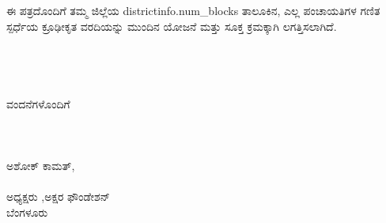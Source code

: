 \documentclass[12pt]{article}
\begin{document}
{{\\~\\
ಈ ಪತ್ರದೊಂದಿಗೆ ತಮ್ಮ ಜಿಲ್ಲೆಯ {{districtinfo.num_blocks}} ತಾಲೂಕಿನ, ಎಲ್ಲ ಪಂಚಾಯತಿಗಳ ಗಣಿತ ಸ್ಪರ್ಧೆಯ ಕ್ರೂಢೀಕೃತ ವರದಿಯನ್ನು ಮುಂದಿನ ಯೋಜನೆ ಮತ್ತು ಸೂಕ್ತ ಕ್ರಮಕ್ಕಾಗಿ ಲಗತ್ತಿಸಲಾಗಿದೆ.
\\~\\~\\~\\~\\
ವಂದನೆಗಳೊಂದಿಗೆ
\\~\\~\\~\\
ಅಶೋಕ್ ಕಾಮತ್,
\\~\\
ಅಧ್ಯಕ್ಷರು ,ಅಕ್ಷರ ಫೌಂಡೇಶನ್\\[1ex]
ಬೆಂಗಳೂರು\\
}
}

\pagebreak
\end{document}
